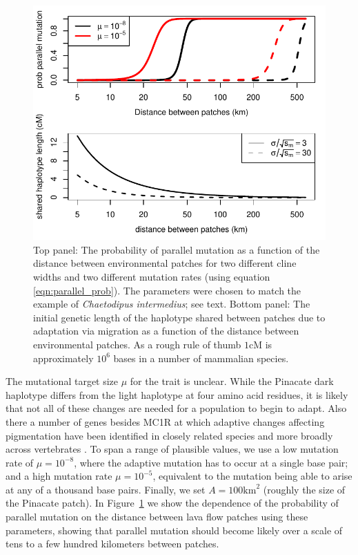 \documentclass{article}
\newcommand{\citep}[1]{\cite{#1}}
\begin{document}
\begin{figure}[ht]
  \begin{center}
    \includegraphics{Lava_flow_mice_prob_parallel}
  \end{center}
  \caption{
Top panel: The probability of parallel mutation as a function of the distance
between environmental patches for two different cline widths
and two different mutation rates (using equation \eqref{eqn:parallel_prob}). 
The parameters were chosen to match the example of \textit{Chaetodipus intermedius};
see text. Bottom panel: The initial genetic length of the haplotype
shared between patches due to adaptation via migration as a function
of the distance between environmental patches. As a rough rule of
thumb $1$cM is approximately $10^6$ bases in a number of mammalian species. 
  \label{fig:mice_prob_parallel}
  }
\end{figure}

The mutational target size $\mu$ for the trait is unclear. 
While the Pinacate dark haplotype differs from the light haplotype at four amino acid residues,
it is likely that not all of these changes are needed for a population to begin to adapt. 
Also there a number of genes besides MC1R at which adaptive changes affecting pigmentation 
have been identified in closely related species and more broadly across vertebrates \citep{Hoekstra:06}.
To span a range of plausible values, we use a low mutation rate of $\mu= 10^{-8}$, 
where the adaptive mutation has to occur at a single base pair; 
and a high mutation rate $\mu= 10^{-5}$, equivalent to the mutation
being able to arise at any of a thousand base pairs.  
Finally, we set $A=100\text{km}^2$ (roughly the size of the Pinacate
patch). In
Figure~\ref{fig:mice_prob_parallel} we show the dependence of the probability
of parallel mutation on the distance between lava flow patches using these parameters, 
showing that parallel mutation should become
likely over a scale of tens to a few hundred kilometers between patches. 
\end{document}
